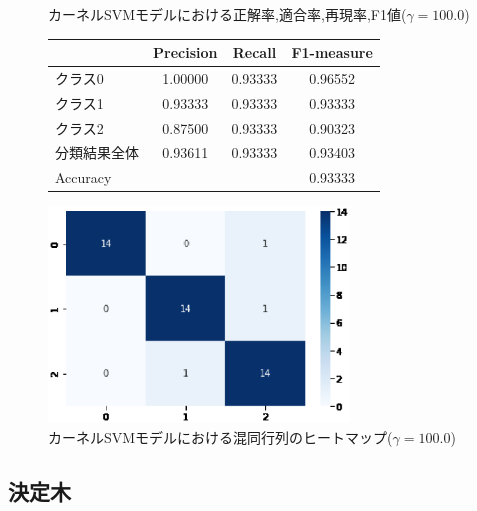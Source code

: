 \documentclass{jarticle}     %
\makeatletter
\newcommand{\tblcaption}[1]{\def\@captype{table}\caption{#1}}
\makeatother
\begin{document}
\begin{figure}[H]
  \def\@captype{table}
  \begin{minipage}[c]{.48\textwidth}
    \tblcaption{カーネルSVMモデルにおける正解率,適合率,再現率,F1値($\gamma = 100.0$)}
    \label{table:カーネル100SVM}
    \centering
      \begin{tabular}{lccc}
        \hline
        & Precision  &  Recall &  F1-measure \\
        \hline
        クラス0  & 1.00000  & 0.93333 & 0.96552 \\
        クラス1  & 0.93333  & 0.93333 & 0.93333 \\
        クラス2  & 0.87500  & 0.93333 & 0.90323 \\
        分類結果全体  &  0.93611  &  0.93333 & 0.93403 \\
        \hline
        Accuracy & & & 0.93333\\
        \hline
      \end{tabular}
  \end{minipage}
  \hfill
  \begin{minipage}[c]{.48\textwidth}
    \includegraphics[width=80mm]{assets/kernel100_heatmap.eps}
    \caption{カーネルSVMモデルにおける混同行列のヒートマップ($\gamma = 100.0$)}
    \label{fig:カーネル100.0SVM}
  \end{minipage}
\end{figure}

\subsection{決定木}
\end{document}

